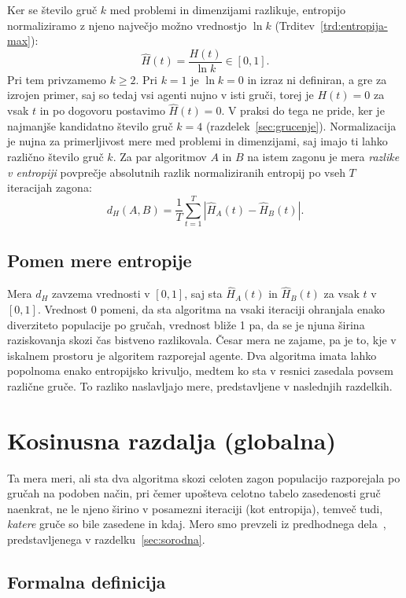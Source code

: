 \documentclass[a4paper, 12pt]{book}
\begin{document}
Ker se število gruč $k$ med problemi
in dimenzijami razlikuje, entropijo normaliziramo z njeno največjo možno
vrednostjo $\ln k$ (Trditev~\ref{trd:entropija-max}):
\[
    \hat{H}(t) = \frac{H(t)}{\ln k} \in [0, 1].
\]
Pri tem privzamemo $k \ge 2$. Pri $k = 1$ je $\ln k = 0$ in izraz ni
definiran, a gre za izrojen primer, saj so tedaj vsi agenti nujno v isti
gruči, torej je $H(t) = 0$ za vsak $t$ in po dogovoru postavimo
$\hat{H}(t) = 0$. V praksi do tega ne pride, ker je najmanjše kandidatno
število gruč $k = 4$ (razdelek~\ref{sec:grucenje}).
Normalizacija je nujna za primerljivost mere med problemi in dimenzijami, saj
imajo ti lahko različno število gruč $k$. Za par algoritmov $A$ in $B$ na istem 
zagonu je mera \emph{razlike v entropiji} povprečje absolutnih razlik normaliziranih 
entropij po vseh $T$ iteracijah zagona:
\[
    d_H(A, B) = \frac{1}{T} \sum_{t=1}^{T} \left| \hat{H}_A(t) - \hat{H}_B(t) \right|.
\]

\subsection{Pomen mere entropije}

Mera $d_H$ zavzema vrednosti v $[0, 1]$, saj sta $\hat{H}_A(t)$ in
$\hat{H}_B(t)$ za vsak $t$ v $[0,1]$. Vrednost 0 pomeni, da sta algoritma na
vsaki iteraciji ohranjala enako diverziteto populacije po gručah, vrednost bliže
1 pa, da se je njuna širina raziskovanja skozi čas bistveno razlikovala.
Česar mera ne zajame, pa je to, kje v iskalnem prostoru je algoritem razporejal
agente. Dva algoritma imata lahko popolnoma enako entropijsko krivuljo, 
medtem ko sta v resnici zasedala povsem različne gruče. 
To razliko naslavljajo mere, predstavljene v naslednjih razdelkih.

\section{Kosinusna razdalja (globalna)}
\label{sec:cosine}

Ta mera meri, ali sta dva algoritma skozi celoten zagon populacijo
razporejala po gručah na podoben način, pri čemer upošteva celotno
tabelo zasedenosti gruč naenkrat, ne le njeno širino v posamezni
iteraciji (kot entropija), temveč tudi, \emph{katere} gruče so bile
zasedene in kdaj. Mero smo prevzeli iz predhodnega dela~\cite{clustopt2025},
predstavljenega v razdelku~\ref{sec:sorodna}.

\subsection{Formalna definicija}
\end{document}
